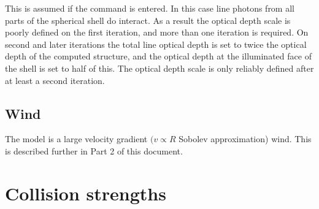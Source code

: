   This is assumed if the  command
is entered.
In this case line photons from all parts of the spherical shell
do interact.
As a result the optical depth scale is poorly defined on the
first iteration, and more than one iteration is required.
On second and
later iterations the total line optical depth is set to twice the optical
depth of the computed structure, and the optical depth at the illuminated
face of the shell is set to half of this.
The optical depth scale is only
reliably defined after at least a second iteration.

\subsection{Wind }

The model is a large velocity gradient $(v\propto R$ Sobolev approximation) wind.
This is described further in Part 2 of this document.

\section{Collision strengths }

